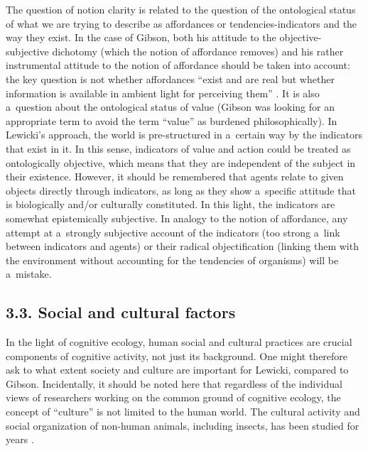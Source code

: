 The question of notion clarity is related to the question of the ontological status of what we are trying to describe as affordances or tendencies-indicators and the way they exist. In the case of Gibson, both his attitude to the objective-subjective dichotomy (which the notion of affordance removes) and his rather instrumental attitude to the notion of affordance should be taken into account: the key question is not whether affordances ``exist and are real but whether information is available in ambient light for perceiving them'' 
\parencite[][p.140]{gibson_ecological_1979}. %
 It is also a~question about the ontological status of value (Gibson was looking for an appropriate term to avoid the term ``value'' as burdened philosophically). In Lewicki's approach, the world is pre-structured in a~certain way by the indicators that exist in it. In this sense, indicators of value and action could be treated as ontologically objective, which means that they are independent of the subject in their existence. However, it should be remembered that agents relate to given objects directly through indicators, as long as they show a~specific attitude that is biologically and/or culturally constituted. In this light, the indicators are somewhat epistemically subjective. In analogy to the notion of affordance, any attempt at a~strongly subjective account of the indicators (too strong a~link between indicators and agents) or their radical objectification (linking them with the environment without accounting for the tendencies of organisms) will be a~mistake.



\subsection*{3.3. Social and cultural factors}



In the light of cognitive ecology, human social and cultural practices are crucial components of cognitive activity, not just its background. One might therefore ask to what extent society and culture are important for Lewicki, compared to Gibson. Incidentally, it should be noted here that regardless of the individual views of researchers working on the common ground of cognitive ecology, the concept of ``culture'' is not limited to the human world. The cultural activity and social organization of non-human animals, including insects, has been studied for years 
\parencite[see e.g.,][]{zuk_sex_2011}.%




